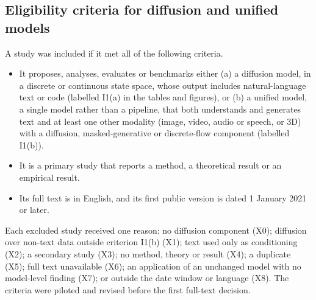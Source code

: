 \subsection{Eligibility criteria for diffusion and unified models}
\label{sec:method-eligibility}
A study was included if it met all of the following criteria.
\begin{itemize}
  \item It proposes, analyses, evaluates or benchmarks either (a) a diffusion model, in a discrete or continuous state space, whose output includes natural-language text or code (labelled I1(a) in the tables and figures), or (b) a unified model, a single model rather than a pipeline, that both understands and generates text and at least one other modality (image, video, audio or speech, or 3D) with a diffusion, masked-generative or discrete-flow component (labelled I1(b)).
  \item It is a primary study that reports a method, a theoretical result or an empirical result.
  \item Its full text is in English, and its first public version is dated 1 January 2021 or later.
\end{itemize}
Each excluded study received one reason: no diffusion component (X0); diffusion over non-text data outside criterion I1(b) (X1); text used only as conditioning (X2); a secondary study (X3); no method, theory or result (X4); a duplicate (X5); full text unavailable (X6); an application of an unchanged model with no model-level finding (X7); or outside the date window or language (X8). The criteria were piloted and revised before the first full-text decision.

